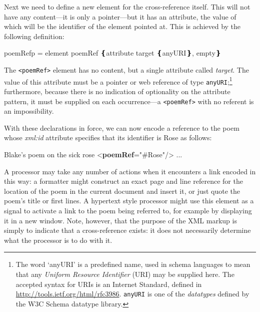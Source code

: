 Next we need to define a new element for the cross-reference itself. This will not have any content—it is only a pointer—but it has an attribute, the value of which will be the identifier of the element pointed at. This is achieved by the following definition: \par\hfill\bgroup\exampleFont\vskip 10pt\begin{shaded}
\obeyspaces poemRef\textunderscore p = element poemRef ❴attribute target ❴anyURI❵, empty❵\end{shaded}
\par\egroup 
\par
The \texttt{<poemRef>} element has no content, but a single attribute called {\itshape target}. The value of this attribute must be a pointer or web reference of type \texttt{anyURI};\footnote{The word ‘anyURI’ is a predefined name, used in schema languages to mean that any \textit{Uniform Resource Identifier} (URI) may be supplied here. The accepted syntax for URIs is an Internet Standard, defined in \url{http://tools.ietf.org/html/rfc3986}. \texttt{anyURI} is one of the \textit{datatypes} defined by the W3C Schema datatype library.} furthermore, because there is no indication of optionality on the attribute pattern, it must be supplied on each occurrence—a \texttt{<poemRef>} with no referent is an impossibility.\par
With these declarations in force, we can now encode a reference to the poem whose {\itshape xml:id} attribute specifies that its identifier is Rose as follows: \par\bgroup\exampleFont \begin{shaded}\noindent\mbox{}Blake's poem on the sick rose\mbox{}\newline 
{<\textbf{poemRef}\hspace*{1em}{target}="{\#Rose}"/>} ...\end{shaded}\egroup\par \noindent  \par
A processor may take any number of actions when it encounters a link encoded in this way: a formatter might construct an exact page and line reference for the location of the poem in the current document and insert it, or just quote the poem's title or first lines. A hypertext style processor might use this element as a signal to activate a link to the poem being referred to, for example by displaying it in a new window. Note, however, that the purpose of the XML markup is simply to indicate that a cross-reference exists: it does not necessarily determine what the processor is to do with it.\par

